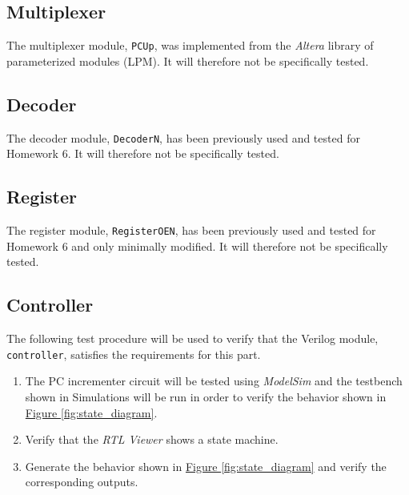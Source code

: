 \subsection{Multiplexer} %
\label{sub:multiplexer}

The multiplexer module, \verb|PCUp|, was implemented from the \emph{Altera} library of parameterized modules (LPM).
It will therefore not be specifically tested.


\subsection{Decoder} %
\label{sub:decoder}

The decoder module, \verb|DecoderN|, has been previously used and tested for Homework 6.
It will therefore not be specifically tested.

\subsection{Register} %
\label{sub:register}

The register module, \verb|RegisterOEN|, has been previously used and tested for Homework 6 and only minimally modified.
It will therefore not be specifically tested.

\subsection{Controller} %
\label{sub:controller}

The following test procedure will be used to verify that the Verilog module, \verb|controller|, satisfies the requirements for this part.

\begin{enumerate}
    \item The PC incrementer circuit will be tested using \emph{ModelSim} and the testbench shown in %
    Simulations will be run in order to verify the behavior shown in
    \hyperref[fig:state_diagram]{Figure \ref*{fig:state_diagram}}.
    \item Verify that the \emph{RTL Viewer} shows a state machine.
    \item Generate the behavior shown in \hyperref[fig:state_diagram]{Figure \ref*{fig:state_diagram}} and verify the corresponding outputs.
\end{enumerate}

